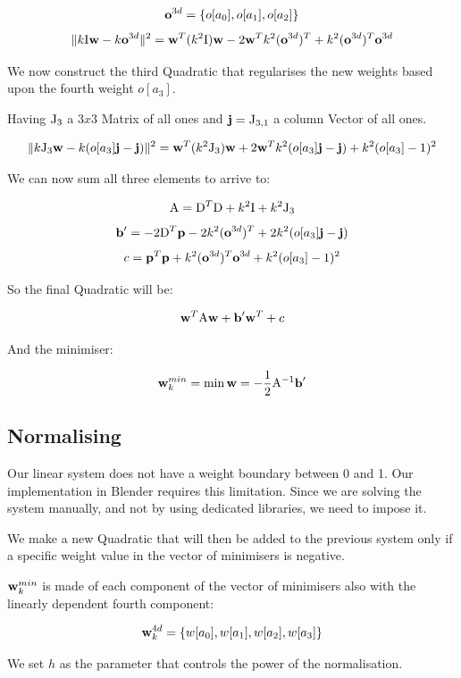 \documentclass[12pt,twoside]{report}
\begin{document}
\[\boldsymbol{ \mathrm{o} }^{3d} = \{o[a_0], o[a_1], o[a_2]\}\]
\[\|k\mathrm{I}\boldsymbol{ \mathrm{w} }-k\boldsymbol{ \mathrm{o} }^{3d}\|^2 = \boldsymbol{ \mathrm{w} }^T (k^2\mathrm{I}) \boldsymbol{ \mathrm{w} } - 2 \boldsymbol{ \mathrm{w} }^T k^2(\boldsymbol{ \mathrm{o} }^{3d})^T + k^2 (\boldsymbol{ \mathrm{o} }^{3d})^T\boldsymbol{ \mathrm{o} }^{3d}\]

We now construct the third Quadratic that regularises the new weights based upon the fourth weight $o[a_3]$.

Having $\mathrm{J}_3$ a $3x3$ Matrix of all ones and $\boldsymbol{ \mathrm{j} } = \mathrm{J}_{3,1}$ a column Vector of all ones.

\[\|k\mathrm{J}_3\boldsymbol{ \mathrm{w} }-k(o[a_3]\boldsymbol{ \mathrm{j} } - \boldsymbol{ \mathrm{j} })\|^2 = \boldsymbol{ \mathrm{w} }^T (k^2\mathrm{J}_3) \boldsymbol{ \mathrm{w} } + 2 \boldsymbol{ \mathrm{w} }^T k^2(o[a_3]\boldsymbol{ \mathrm{j} } - \boldsymbol{ \mathrm{j} }) + k^2(o[a_3]-1)^2\]

We can now sum all three elements to arrive to:

\[\mathrm{A} = \mathrm{D}^T\mathrm{D} + k^2\mathrm{I} + k^2\mathrm{J}_3\]
\[\boldsymbol{ \mathrm{b} }' = -2\mathrm{D}^T \boldsymbol{ \mathrm{p} } - 2k^2(\boldsymbol{ \mathrm{o} }^{3d})^T + 2k^2(o[a_3]\boldsymbol{ \mathrm{j} } - \boldsymbol{ \mathrm{j} })\]
\[c = \boldsymbol{ \mathrm{p} }^T\boldsymbol{ \mathrm{p} } + k^2(\boldsymbol{ \mathrm{o} }^{3d})^T\boldsymbol{ \mathrm{o} }^{3d} + k^2(o[a_3]-1)^2\]

So the final Quadratic will be:

\begin{equation}
\label{eq:evaluateQuadratic}
\boldsymbol{ \mathrm{w} }^T\mathrm{A}\boldsymbol{ \mathrm{w} } + \boldsymbol{ \mathrm{b} }'\boldsymbol{ \mathrm{w} }^T + c
\end{equation}

And the minimiser:

\[\boldsymbol{ \mathrm{w} }^{min}_k = \min\boldsymbol{ \mathrm{w} } = -\frac{1}{2} \mathrm{A}^{-1}\boldsymbol{ \mathrm{b} }'\]

\subsection{Normalising}
\label{sec:normalise_method}
Our linear system does not have a weight boundary between 0 and 1. Our implementation in Blender requires this limitation. Since we are solving the system manually, and not by using dedicated libraries, we need to impose it.

We make a new Quadratic that will then be added to the previous system only if a specific weight value in the vector of minimisers is negative.

$\boldsymbol{ \mathrm{w} }^{min}_k$ is made of each component of the vector of minimisers also with the linearly dependent fourth component:

\[\boldsymbol{ \mathrm{w} }^{4d}_k = \{w[a_0], w[a_1], w[a_2], w[a_3]\}\]

We set $h$ as the parameter that controls the power of the normalisation.
\end{document}
